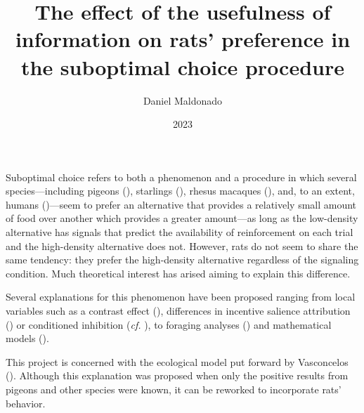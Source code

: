 \documentclass[a4paper,12pt]{article}
\title{The effect of the usefulness of information on rats' preference in the suboptimal choice procedure}
\author{Daniel Maldonado}
\date{2023}
\begin{document}
{\bfseries \maketitle}

Suboptimal choice refers to both a phenomenon and a procedure in which several species---including pigeons (\cite{Gipson2009}), starlings (\cite{Vasconcelos2015}), rhesus macaques (\cite{Smith2017}), and, to an extent, humans (\cite{Molet2012})---seem to prefer an alternative that provides a relatively small amount of food over another which provides a greater amount---as long as the low-density alternative has signals that predict the availability of reinforcement on each trial and the high-density alternative does not.
However, rats do not seem to share the same tendency: they prefer the high-density alternative regardless of the signaling condition. Much theoretical interest has arised aiming to explain this difference.


Several explanations for this phenomenon have been proposed ranging from local variables such as a contrast effect (\cite{Zentall2016}), differences in incentive salience attribution (\cite{Chow2017}) or conditioned inhibition ({\itshape cf.} \cite{Laude2014a,Trujano2016}), to foraging analyses (\cite{Vasconcelos2015}) and mathematical models (\cite{Cunningham2018,Daniels2018}).

This project is concerned with the ecological model put forward by Vasconcelos (\citeyear{Vasconcelos2015}). Although this explanation was proposed when only the positive results from pigeons and other species were known, it can be reworked to incorporate rats' behavior.
\end{document}
